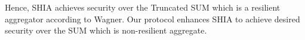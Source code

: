	Hence, SHIA achieves security over the Truncated SUM which is a resilient aggregator according to Wagner\cite{wagner2004resilient}.
	Our protocol enhances SHIA to achieve desired security over the SUM which is non-resilient aggregate.

